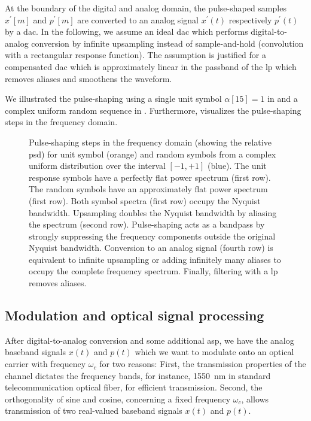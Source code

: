 At the boundary of the digital and analog domain, the pulse-shaped samples $x^\prime[m]$ and $p^\prime[m]$ are converted to an analog signal $x^\prime(t)$ respectively $p^\prime(t)$ by a \gls{dac}.
In the following, we assume an ideal \gls{dac} which performs digital-to-analog conversion by infinite upsampling instead of sample-and-hold (convolution with a rectangular response function).
The assumption is justified for a compensated \gls{dac} which is approximately linear in the passband of the \gls{lp} which removes aliases and smoothens the waveform.

We illustrated the pulse-shaping using a single unit symbol $\alpha[15]=1$ in  and a complex uniform random sequence in .
Furthermore,  visualizes the pulse-shaping steps in the frequency domain.
\begin{figure}[htb]
	\centering
	
	\caption{Pulse-shaping steps in the frequency domain (showing the relative \gls{psd}) for unit symbol (orange) and random symbols from a complex uniform distribution over the interval $[-1,+1]$ (blue). The unit response symbols have a perfectly flat power spectrum (first row). The random symbols have an approximately flat power spectrum (first row). Both symbol spectra (first row) occupy the Nyquist bandwidth. Upsampling doubles the Nyquist bandwidth by aliasing the spectrum (second row). Pulse-shaping acts as a bandpass by strongly suppressing the frequency components outside the original Nyquist bandwidth. Conversion to an analog signal (fourth row) is equivalent to infinite upsampling or adding infinitely many aliases to occupy the complete frequency spectrum. Finally, filtering with a \gls{lp} removes aliases.}\label{fig:pulse_shaping_freq}
\end{figure}

\FloatBarrier
\subsection{Modulation and optical signal processing}

After digital-to-analog conversion and some additional \gls{asp}, we have the analog baseband signals $x(t)$ and $p(t)$ which we want to modulate onto an optical carrier with frequency $\omega_c$ for two reasons:
First, the transmission properties of the channel dictates the frequency bands, for instance, \SI{1550}{\nano\meter} in standard telecommunication optical fiber, for efficient transmission.
Second, the orthogonality of sine and cosine, concerning a fixed frequency $\omega_c$, allows transmission of two real-valued baseband signals $x(t)$ and $p(t)$.

